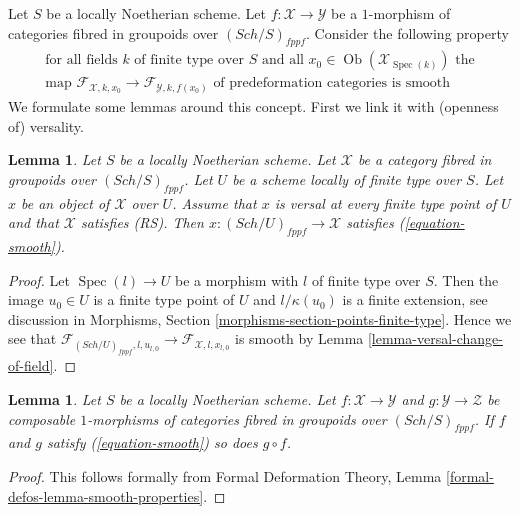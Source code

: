 \documentclass{stacks-project}
\theoremstyle{plain}
\newtheorem{lemma}[subsection]{Lemma}
\theoremstyle{definition}
\theoremstyle{remark}
\numberwithin{equation}{subsection}
\def\Spec{\mathop{\mathrm{Spec}}}
\def\Sch{\mathit{Sch}}
\def\Ob{\mathop{\mathrm{Ob}}\nolimits}
\begin{document}
\noindent
Let $S$ be a locally Noetherian scheme.
Let $f : \mathcal{X} \to \mathcal{Y}$ be a $1$-morphism of categories
fibred in groupoids over $(\Sch/S)_{fppf}$. Consider the following property
\begin{equation}
\label{equation-smooth}
\begin{matrix}
\text{for all fields }k\text{ of finite type over }S
\text{ and all }x_0 \in \Ob(\mathcal{X}_{\Spec(k)})\text{ the}\\
\text{map }
\mathcal{F}_{\mathcal{X}, k, x_0} \to \mathcal{F}_{\mathcal{Y}, k, f(x_0)}
\text{ of predeformation categories is smooth}
\end{matrix}
\end{equation}
We formulate some lemmas around this concept. First we link it with
(openness of) versality.

\begin{lemma}
\label{lemma-versal-smooth}
Let $S$ be a locally Noetherian scheme. Let $\mathcal{X}$ be a category
fibred in groupoids over $(\Sch/S)_{fppf}$. Let $U$ be a scheme locally
of finite type over $S$. Let $x$ be an object of $\mathcal{X}$ over $U$.
Assume that $x$ is versal at every finite type point of $U$ and that
$\mathcal{X}$ satisfies (RS). Then $x : (\Sch/U)_{fppf} \to \mathcal{X}$
satisfies (\ref{equation-smooth}).
\end{lemma}

\begin{proof}
Let $\Spec(l) \to U$ be a morphism with $l$ of finite type over $S$.
Then the image $u_0 \in U$ is a finite type point of $U$ and
$l/\kappa(u_0)$ is a finite extension, see discussion in
Morphisms, Section \ref{morphisms-section-points-finite-type}.
Hence we see that
$\mathcal{F}_{(\Sch/U)_{fppf}, l, u_{l, 0}} \to
\mathcal{F}_{\mathcal{X}, l, x_{l, 0}}$
is smooth by Lemma \ref{lemma-versal-change-of-field}.
\end{proof}

\begin{lemma}
\label{lemma-composition-smooth}
Let $S$ be a locally Noetherian scheme. Let $f : \mathcal{X} \to \mathcal{Y}$
and $g : \mathcal{Y} \to \mathcal{Z}$ be composable $1$-morphisms of
categories fibred in groupoids over $(\Sch/S)_{fppf}$. If $f$ and $g$
satisfy (\ref{equation-smooth}) so does $g \circ f$.
\end{lemma}

\begin{proof}
This follows formally from Formal Deformation Theory, Lemma
\ref{formal-defos-lemma-smooth-properties}.
\end{proof}
\end{document}
